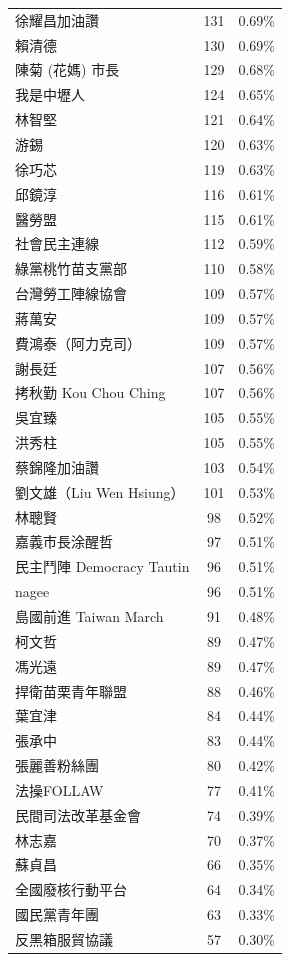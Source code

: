 \documentclass[letterpaper, 10pt, conference]{ieeeconf}   %
\begin{document}
\begin{CJK}{UTF8}{bsmi}
\begin{longtable}[c]{@{}lcc@{}}
徐耀昌加油讚 & 131 & 0.69\% \\
賴清德 & 130 & 0.69\% \\
陳菊 (花媽) 市長 & 129 & 0.68\% \\
我是中壢人 & 124 & 0.65\% \\
林智堅 & 121 & 0.64\% \\
游錫\charkun{} & 120 & 0.63\% \\
徐巧芯 & 119 & 0.63\% \\
邱鏡淳 & 116 & 0.61\% \\
醫勞盟 & 115 & 0.61\% \\
社會民主連線 & 112 & 0.59\% \\
綠黨桃竹苗支黨部 & 110 & 0.58\% \\
台灣勞工陣線協會 & 109 & 0.57\% \\
蔣萬安 & 109 & 0.57\% \\
費鴻泰（阿力克司） & 109 & 0.57\% \\
謝長廷 & 107 & 0.56\% \\
拷秋勤 Kou Chou Ching & 107 & 0.56\% \\
吳宜臻 & 105 & 0.55\% \\
洪秀柱 & 105 & 0.55\% \\
蔡錦隆加油讚 & 103 & 0.54\% \\
劉文雄（Liu Wen Hsiung） & 101 & 0.53\% \\
林聰賢 & 98 & 0.52\% \\
嘉義市長涂醒哲 & 97 & 0.51\% \\
民主鬥陣 Democracy Tautin & 96 & 0.51\% \\
nagee & 96 & 0.51\% \\
島國前進 Taiwan March & 91 & 0.48\% \\
柯文哲 & 89 & 0.47\% \\
馮光遠 & 89 & 0.47\% \\
捍衛苗栗青年聯盟 & 88 & 0.46\% \\
葉宜津 & 84 & 0.44\% \\
張承中 & 83 & 0.44\% \\
張麗善粉絲團 & 80 & 0.42\% \\
法操FOLLAW & 77 & 0.41\% \\
民間司法改革基金會 & 74 & 0.39\% \\
林志嘉 & 70 & 0.37\% \\
蘇貞昌 & 66 & 0.35\% \\
全國廢核行動平台 & 64 & 0.34\% \\
國民黨青年團 & 63 & 0.33\% \\
反黑箱服貿協議 & 57 & 0.30\% \\

\end{longtable}
\end{CJK}
\end{document}
